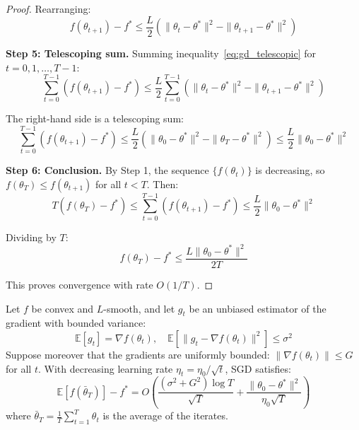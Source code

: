 \begin{proof}
	Rearranging:
	\begin{equation}\label{eq:gd_telescopic}
		f(\theta_{t+1}) - f^* \leq \frac{L}{2}\left(\|\theta_t - \theta^*\|^2 - \|\theta_{t+1} - \theta^*\|^2\right)
	\end{equation}

	\textbf{Step 5: Telescoping sum.}
	Summing inequality~\eqref{eq:gd_telescopic} for \(t = 0, 1, \ldots, T-1\):
	\[
		\sum_{t=0}^{T-1} (f(\theta_{t+1}) - f^*) \leq \frac{L}{2} \sum_{t=0}^{T-1} \left(\|\theta_t - \theta^*\|^2 - \|\theta_{t+1} - \theta^*\|^2\right)
	\]

	The right-hand side is a telescoping sum:
	\[
		\sum_{t=0}^{T-1} (f(\theta_{t+1}) - f^*) \leq \frac{L}{2}\left(\|\theta_0 - \theta^*\|^2 - \|\theta_T - \theta^*\|^2\right) \leq \frac{L}{2}\|\theta_0 - \theta^*\|^2
	\]

	\textbf{Step 6: Conclusion.}
	By Step 1, the sequence \(\{f(\theta_t)\}\) is decreasing, so \(f(\theta_T) \leq f(\theta_{t+1})\) for all \(t < T\). Then:
	\[
		T(f(\theta_T) - f^*) \leq \sum_{t=0}^{T-1} (f(\theta_{t+1}) - f^*) \leq \frac{L}{2}\|\theta_0 - \theta^*\|^2
	\]

	Dividing by \(T\):
	\[
		f(\theta_T) - f^* \leq \frac{L\|\theta_0 - \theta^*\|^2}{2T}
	\]

	This proves convergence with rate \(O(1/T)\).
\end{proof}

\begin{theorem}\label{thm:sgd_convergence}
	Let \(f\) be convex and \(L\)-smooth, and let \(g_t\) be an unbiased estimator of the gradient with bounded variance:
	\[
		\mathbb{E}[g_t] = \nabla f(\theta_t), \quad \mathbb{E}[\|g_t - \nabla f(\theta_t)\|^2] \leq \sigma^2
	\]
	Suppose moreover that the gradients are uniformly bounded: \(\|\nabla f(\theta_t)\| \leq G\) for all \(t\). With decreasing learning rate \(\eta_t = \eta_0/\sqrt{t}\), SGD satisfies:
	\[
		\mathbb{E}[f(\bar{\theta}_T)] - f^* = O\!\left(\frac{(\sigma^2 + G^2)\log T}{\sqrt{T}} + \frac{\|\theta_0 - \theta^*\|^2}{\eta_0\sqrt{T}}\right)
	\]
	where \(\bar{\theta}_T = \frac{1}{T}\sum_{t=1}^T \theta_t\) is the average of the iterates.
\end{theorem}

